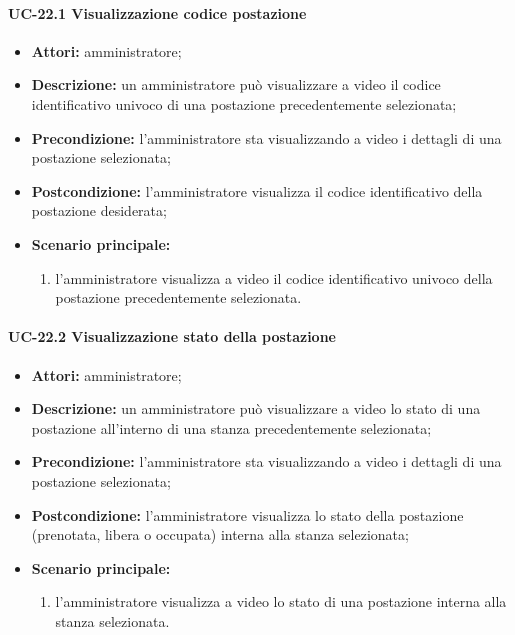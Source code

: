\paragraph{UC-22.1 Visualizzazione codice postazione}
\begin{itemize}
    \item \textbf{Attori:} amministratore;
    \item \textbf{Descrizione:} un amministratore pu\`{o} visualizzare a video il codice identificativo univoco di una postazione precedentemente selezionata;
    \item \textbf{Precondizione:} l'amministratore sta visualizzando a video i dettagli di una postazione selezionata;
    \item \textbf{Postcondizione:} l'amministratore visualizza il codice identificativo della postazione desiderata;
    \item \textbf{Scenario principale:}
    \begin{enumerate}
        \item l'amministratore visualizza a video il codice identificativo univoco della postazione precedentemente selezionata.
    \end{enumerate}
\end{itemize}

\paragraph{UC-22.2 Visualizzazione stato della postazione}
\begin{itemize}
    \item \textbf{Attori:} amministratore;
    \item \textbf{Descrizione:} un amministratore pu\`{o} visualizzare a video lo stato di una postazione all'interno di una stanza precedentemente selezionata;
    \item \textbf{Precondizione:} l'amministratore sta visualizzando a video i dettagli di una postazione selezionata;
    \item \textbf{Postcondizione:} l'amministratore visualizza lo stato della postazione (prenotata, libera o occupata) interna alla stanza selezionata;
    \item \textbf{Scenario principale:}
    \begin{enumerate}
        \item l'amministratore visualizza a video lo stato di una postazione interna alla stanza selezionata.
    \end{enumerate}
\end{itemize}
    

